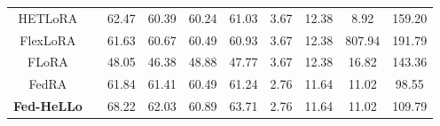 \documentclass[lettersize,journal]{IEEEtran}
\begin{document}
\begin{table}[t]
{\begin{tabular}{c|c|cccc|cccc}
    HETLoRA &       & 62.47	&60.39	&60.24	&61.03 &  3.67     & 12.38      & 8.92      &159.20  \\
    FlexLoRA &     & 61.63	&60.67	&60.49	&60.93  & 3.67      & 12.38      & 807.94      &191.79  \\
    FLoRA &       &48.05	&46.38	&48.88	&47.77 & 3.67      & 12.38      &  16.82     &143.36  \\
    FedRA &     & 61.84	  &61.41	&60.49	&61.24  & 2.76      &11.64       & 11.02      &98.55  \\
    \textbf{Fed-HeLLo} &       & \cellcolor[rgb]{ .749,  .749,  .749}68.22 & \cellcolor[rgb]{ .749,  .749,  .749}62.03 & \cellcolor[rgb]{ .749,  .749,  .749}60.89 & \cellcolor[rgb]{ .749,  .749,  .749}63.71 & 2.76      & 11.64      & 11.02      & 109.79 \\
    \bottomrule[1pt]
  \end{tabular}%
    }
  \label{tab:main-natural_instruction}%
  
\end{table}%
\end{document}
